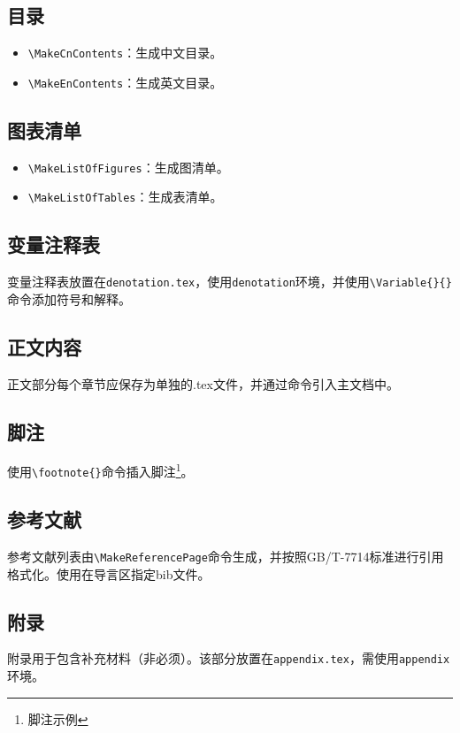 \subsection{目录}
\begin{itemize}[itemsep=2pt,topsep=5pt]
    \item \verb|\MakeCnContents|：生成中文目录。
    \item \verb|\MakeEnContents|：生成英文目录。
\end{itemize}

\subsection{图表清单}
\begin{itemize}[itemsep=2pt,topsep=5pt]
    \item \verb|\MakeListOfFigures|：生成图清单。
    \item \verb|\MakeListOfTables|：生成表清单。
\end{itemize}

\subsection{变量注释表}
变量注释表放置在\texttt{denotation.tex}，使用\texttt{denotation}环境，并使用\verb|\Variable{}{}|命令添加符号和解释。

\subsection{正文内容}
正文部分每个章节应保存为单独的.tex文件，并通过\verb||命令引入主文档中。

\subsection{脚注}
使用\verb|\footnote{}|命令插入脚注\footnote{脚注示例}。

\subsection{参考文献}
参考文献列表由\verb|\MakeReferencePage|命令生成，并按照GB/T-7714标准进行引用格式化。使用\verb||在导言区指定bib文件。

\subsection{附录}
附录用于包含补充材料（非必须）。该部分放置在\texttt{appendix.tex}，需使用\texttt{appendix}环境。

